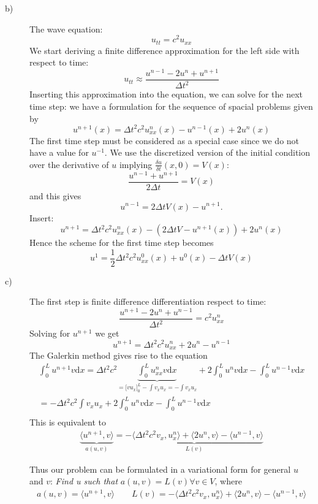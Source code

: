 \documentclass[a4paper,10pt]{article}
\begin{document}
\begin{description}
\vspace{1cm}

\item[b)]
The wave equation:
\[ u_{tt} = c^2 u_{xx} \]
We start deriving a finite difference approximation for the left side with respect to time:
\[ u_{tt} \approx \frac{u^{n-1} - 2 u ^n + u^{n+1} }{ \Delta t^2 } \]
Inserting this approximation into the equation, we can solve for the next time step: we have a formulation for the sequence of spacial problems
given by
\[ u^{n+1} (x) = \Delta t^2 c^2 u_{xx} ^n (x) - u^{n-1} (x) + 2 u ^n (x) \]
The first time step must be considered as a special case since we do not have a value for $u^{-1}$. We use the discretized version of 
the initial condition over the derivative of $u$ implying $\frac{\delta u}{\delta t}(x,0) = V(x)$:
\[ \frac{u^{n-1} + u^{n+1}}{2 \Delta t} = V (x) \]
and this gives
\[ u^{n-1} = 2 \Delta t V (x) - u^{n+1}. \]
Insert:
\[ u^{n+1} = \Delta t^2 c^2 u_{xx}^n (x) - (2 \Delta t V - u^{n+1} (x) ) + 2 u^n (x) \]
Hence the scheme for the first time step becomes 
\[ u^1 = \frac{1}{2} \Delta t^2 c^2 u_{xx}^0 (x) + u^0 (x) - \Delta t V (x) \]
 
\vspace{1cm}
\item[c)]
The first step is finite difference differentiation respect to time: 
\[ \frac{ u^{n+1} -2u^n + u^{n-1} }{\Delta t^2} = c^2 u_{xx}^n \]
Solving for $u^{n+1}$ we get
\[ u^{n+1} = \Delta t^2 c^2 u_{xx}^n + 2 u^n - u^{n-1} \]
The Galerkin method gives rise to the equation
\begin{align*}
 \int_0^L u^{n+1} v \mathrm{d} x = \Delta t^2 c^2 \underbrace{ \int_0^L u_{xx}^n v \mathrm{d} x }_{ = \lbrack v u_x \rbrack_0^L - \int v_x u_x = 
 - \int v_x u_x } +  2 \int_0^L u^n v \mathrm{d} x - \int_0^L u^{n-1} v \mathrm{d} x \\
 = - \Delta t^2 c^2 \int v_x u_x + 2 \int_0^L u^n v \mathrm{d} x - \int_0^L u^{n-1} v \mathrm{d} x \\
\end{align*}
This is equivalent to
\begin{align*}
\underbrace{ \langle u^{n+1},v \rangle}_{ a(u,v) } = \underbrace{ -\langle \Delta t^2 c^2 v_x, u_x^n \rangle + \langle 2 u^n, v \rangle -
\langle u^{n-1}, v \rangle}_{L(v)}
\end{align*}

Thus our problem can be formulated in a variational form for general $u$ and $v$: \newline 
\emph{Find u such that} $a(u,v) = L(v) \forall v \in V$, where
\begin{align*}
a(u,v) = \langle u^{n+1},v \rangle \qquad L(v) = -\langle \Delta t^2 c^2 v_x, u_x^n \rangle + \langle 2 u^n, v \rangle - \langle u^{n-1}, v \rangle
\end{align*}


\end{description}
\end{document}
